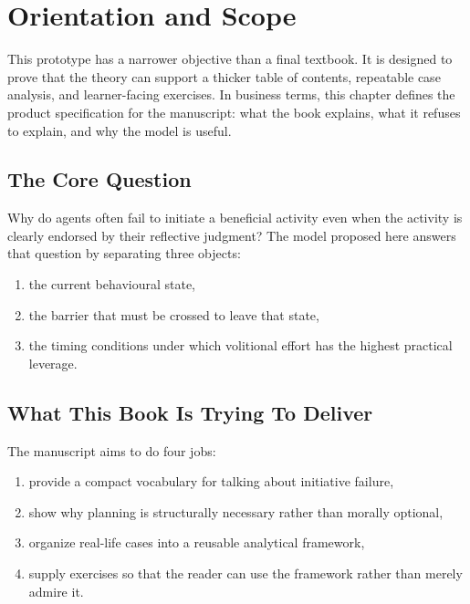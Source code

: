 \section{Orientation and Scope}
\label{sec:orientation}

\begin{roadmapbox}
This prototype has a narrower objective than a final textbook. It is designed
to prove that the theory can support a thicker table of contents, repeatable
case analysis, and learner-facing exercises. In business terms, this chapter
defines the product specification for the manuscript: what the book explains,
what it refuses to explain, and why the model is useful.
\end{roadmapbox}

\subsection{The Core Question}

Why do agents often fail to initiate a beneficial activity even when the
activity is clearly endorsed by their reflective judgment? The model proposed
here answers that question by separating three objects:
\begin{enumerate}[nosep]
  \item the current behavioural state,
  \item the barrier that must be crossed to leave that state,
  \item the timing conditions under which volitional effort has the highest
        practical leverage.
\end{enumerate}

\subsection{What This Book Is Trying To Deliver}

The manuscript aims to do four jobs:
\begin{enumerate}
  \item provide a compact vocabulary for talking about initiative failure,
  \item show why planning is structurally necessary rather than morally
        optional,
  \item organize real-life cases into a reusable analytical framework,
  \item supply exercises so that the reader can use the framework rather than
        merely admire it.
\end{enumerate}

